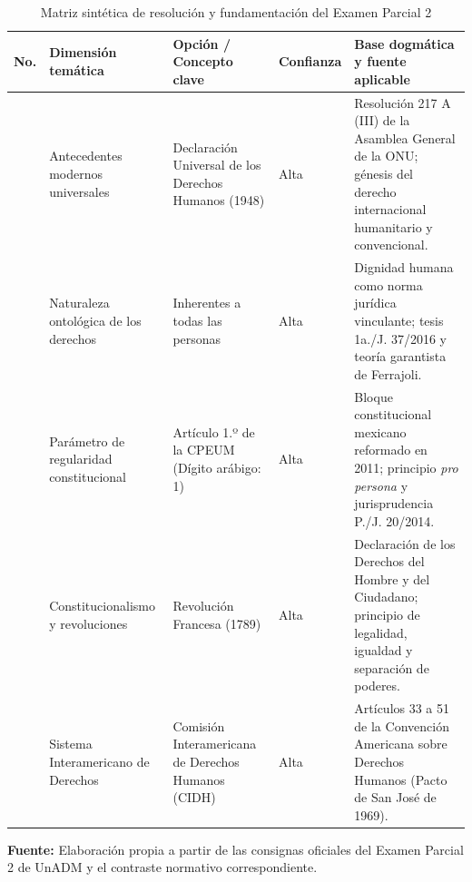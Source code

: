 \documentclass[12pt,spanish,letterpaper,oneside]{article}
\begin{document}
\vspace{8pt}
\begin{table}[htbp]
\centering
\caption{Matriz sint\'etica de resoluci\'on y fundamentaci\'on del Examen Parcial 2}\label{tab:matrizExamen}
\vspace{3pt}
\begingroup
\scriptsize
\setlength{\tabcolsep}{3.5pt}
\renewcommand{\arraystretch}{1.20}
\begin{tabularx}{\linewidth}{>{\bfseries\centering\arraybackslash}p{0.7cm} >{\raggedright\arraybackslash}p{2.3cm} >{\raggedright\arraybackslash}p{2.9cm} >{\centering\arraybackslash}p{1.3cm} >{\raggedright\arraybackslash}X}
\toprule
\rowcolor{tableHeader}
No. & Dimensi\'on tem\'atica & Opci\'on / Concepto clave & Confianza & Base dogm\'atica y fuente aplicable \\
\midrule
1 & Antecedentes modernos universales & Declaraci\'on Universal de los Derechos Humanos (1948) & Alta & Resoluci\'on 217 A (III) de la Asamblea General de la ONU; g\'enesis del derecho internacional humanitario y convencional. \\
\addlinespace
2 & Naturaleza ontol\'ogica de los derechos & Inherentes a todas las personas & Alta & Dignidad humana como norma jur\'idica vinculante; tesis 1a./J. 37/2016 y teor\'ia garantista de Ferrajoli. \\
\addlinespace
3 & Par\'ametro de regularidad constitucional & Art\'iculo 1.º de la CPEUM (D\'igito ar\'abigo: 1) & Alta & Bloque constitucional mexicano reformado en 2011; principio \emph{pro persona} y jurisprudencia P./J. 20/2014. \\
\addlinespace
4 & Constitucionalismo y revoluciones & Revoluci\'on Francesa (1789) & Alta & Declaraci\'on de los Derechos del Hombre y del Ciudadano; principio de legalidad, igualdad y separaci\'on de poderes. \\
\addlinespace
5 & Sistema Interamericano de Derechos & Comisi\'on Interamericana de Derechos Humanos (CIDH) & Alta & Art\'iculos 33 a 51 de la Convenci\'on Americana sobre Derechos Humanos (Pacto de San Jos\'e de 1969). \\
\bottomrule
\end{tabularx}
\endgroup
\par\vspace{3pt}
{\footnotesize\raggedright\textbf{Fuente:} Elaboraci\'on propia a partir de las consignas oficiales del Examen Parcial 2 de UnADM y el contraste normativo correspondiente.\par}
\end{table}
\end{document}
